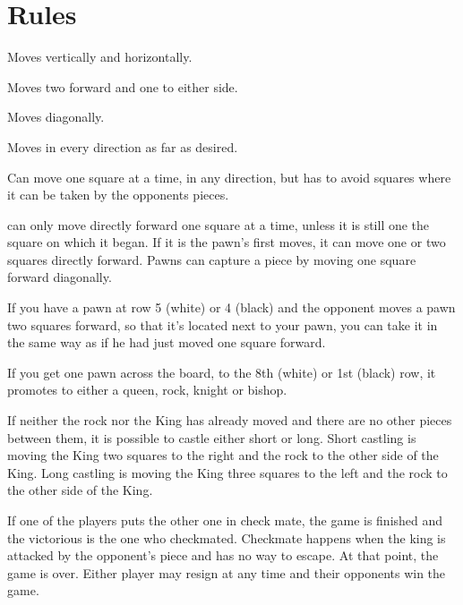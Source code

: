 \documentclass{article}
\begin{document}
\section{Rules}
\begin{description}[align=right]
\item [Rook] \hspace{6mm} Moves vertically and horizontally.
\item [Knight] \hspace{6mm} Moves two forward and one to either side.
\item [Bishop]  \hspace{6mm} Moves diagonally.
\item [Queen] \hspace{6mm} Moves in every direction as far as desired. 
\item [King] \hspace{6mm} Can move one square at a time, in any direction, but has to avoid squares where it can be taken by the opponents pieces.
\item [Pawn] \hspace{6mm} can only move directly forward one square at a time, unless it is still one the square on which it began. If it is the pawn’s first moves, it can move one or two squares directly forward. Pawns can capture a piece by moving one square forward diagonally.
\item [En passant:] \hspace{6mm} If you have a pawn at row 5 (white) or 4 (black) and the opponent moves a pawn two squares forward, so that it’s located next to your pawn, you can take it in the same way as if he had just moved one square forward.
\item [Pawn promotion:] \hspace{6mm} If you get one pawn across the board, to the 8th (white) or 1st (black) row, it promotes to either a queen, rock, knight or bishop.
\item [Castling:] \hspace{6mm} If neither the rock nor the King has already moved and there are no other pieces between them, it is possible to castle either short or long. Short castling is moving the King two squares to the right and the rock to the other side of the King. Long castling is moving the King three squares to the left and the rock to the other side of the King.
\item [Win/loose:] \hspace{6mm} If one of the players puts the other one in check mate, the game is finished and the victorious is the one who checkmated. Checkmate happens when the king is attacked by the opponent's piece and has no way to escape. At that point, the game is over. Either player may resign at any time and their opponents win the game.

\end{description}
\end{document}
